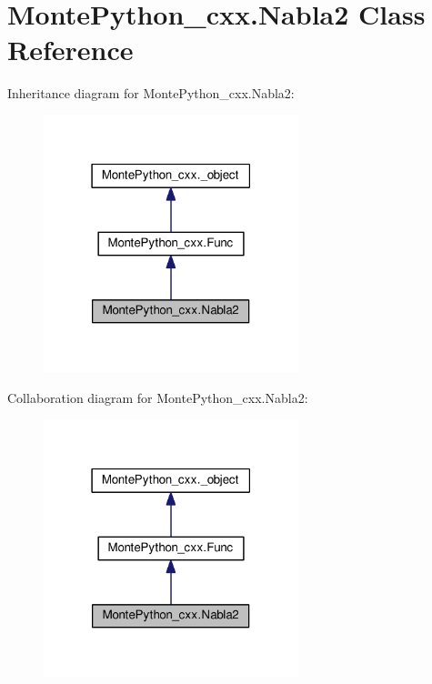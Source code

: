 \hypertarget{classMontePython__cxx_1_1Nabla2}{}\section{Monte\+Python\+\_\+cxx.\+Nabla2 Class Reference}
\label{classMontePython__cxx_1_1Nabla2}


Inheritance diagram for Monte\+Python\+\_\+cxx.\+Nabla2\+:
\nopagebreak
\begin{figure}[H]
\begin{center}
\leavevmode
\includegraphics[width=210pt]{classMontePython__cxx_1_1Nabla2__inherit__graph}
\end{center}
\end{figure}


Collaboration diagram for Monte\+Python\+\_\+cxx.\+Nabla2\+:
\nopagebreak
\begin{figure}[H]
\begin{center}
\leavevmode
\includegraphics[width=210pt]{classMontePython__cxx_1_1Nabla2__coll__graph}
\end{center}
\end{figure}
